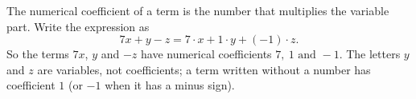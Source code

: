The numerical coefficient of a term is the number that multiplies the variable part. Write the expression as
\[
7x+y-z=7\cdot x+1\cdot y+(-1)\cdot z .
\]
So the terms $7x$, $y$ and $-z$ have numerical coefficients $\boxed{7,\ 1\text{ and }-1}$. The letters $y$ and $z$ are variables, not coefficients; a term written without a number has coefficient $1$ (or $-1$ when it has a minus sign).
